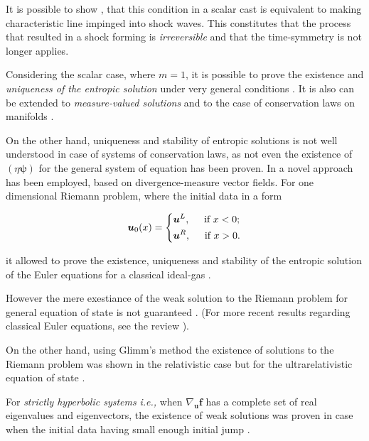It is possible to show \cite{LeVeque:1992}, that this condition in a scalar cast is equivalent to making characteristic line impinged into shock waves. 
This constitutes that the process that resulted in a shock forming is \textit{irreversible} and that the time-symmetry is not longer applies. 

Considering the scalar case, where $m=1$, it is possible to prove the existence and \textit{uniqueness of the entropic solution} under very general conditions \cite{Kruzkov:1970}. 
It is also can be extended to \textit{measure-valued solutions} \cite{DiPerna:1985} and to the case of conservation laws on manifolds \cite{Benartzi:2007}.

On the other hand, uniqueness and stability of entropic solutions is not well understood in case of systems of conservation laws, as not even the existence of $(\eta\boldsymbol{\psi})$ for the general system of equation has been proven. 
In \cite{Chen:2009} a novel approach has been employed, based on divergence-measure vector fields. For one dimensional Riemann problem, where the initial data in a form 

\begin{equation}
\boldsymbol{u}_0(x) = 
\begin{dcases}
\boldsymbol{u}^L, \hspace{5mm} \text{if } x<0; \\
\boldsymbol{u}^R, \hspace{5mm} \text{if } x>0.
\end{dcases}
\end{equation}

it allowed to prove the existence, uniqueness and stability of the entropic solution of the Euler equations for a classical ideal-gas \cite{Chen:2003}.

However the mere exestiance of the weak solution to the Riemann problem for general equation of state is not guaranteed \cite{Curtis:1972}. 
(For more recent results regarding classical Euler equations, see the review \cite{Chen:2006}). 

On the other hand, using Glimm’s method \cite{Glimm:1965} the existence of solutions to the Riemann problem was shown in the relativistic case but for the ultrarelativistic equation of state \cite{Smoller:1993}. 

For \textit{strictly hyperbolic systems} \textit{i.e.,} when $\nabla_{\boldsymbol{u}}\boldsymbol{f}$ has a complete set of real eigenvalues and eigenvectors, the existence of weak solutions was proven in case when the initial data having small enough initial jump \cite{Lax:1957}.


